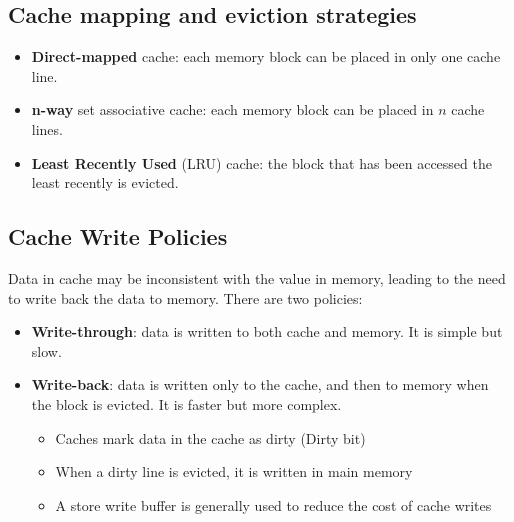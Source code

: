 \subsection{Cache mapping and eviction strategies}
\begin{itemize}
   \item \textbf{Direct-mapped} cache: each memory block can be placed in only one cache line.
   \item \textbf{n-way} set associative cache: each memory block can be placed in $n$ cache lines.
   \item \textbf{Least Recently Used} (LRU) cache: the block that has been accessed the least recently is evicted.
\end{itemize}


\subsection{Cache Write Policies}
Data in cache may be inconsistent with the value in memory, leading to the need to write back the data to memory. There are two policies:
\begin{itemize}
   \item \textbf{Write-through}: data is written to both cache and memory. It is simple but slow.
   \item \textbf{Write-back}: data is written only to the cache, and then to memory when the block is evicted. It is faster but more complex.
   \begin{itemize}
      \item Caches mark data in the cache as dirty (Dirty bit)
      \item When a dirty line is evicted, it is written in main memory
      \item A store write buffer is generally used to reduce the cost of cache writes
   \end{itemize}
\end{itemize}

